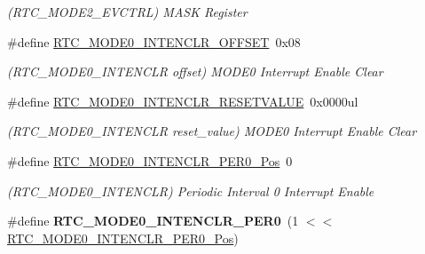 \begin{DoxyCompactItemize}
\begin{DoxyCompactList}\small\item\em (R\+T\+C\+\_\+\+M\+O\+D\+E2\+\_\+\+E\+V\+C\+T\+R\+L) M\+A\+S\+K Register \end{DoxyCompactList}\item 
\hypertarget{group___s_a_m_l21___r_t_c_ga6d79ddd70ff42554b8846fd1d2ac40f5}{}\#define \hyperlink{group___s_a_m_l21___r_t_c_ga6d79ddd70ff42554b8846fd1d2ac40f5}{R\+T\+C\+\_\+\+M\+O\+D\+E0\+\_\+\+I\+N\+T\+E\+N\+C\+L\+R\+\_\+\+O\+F\+F\+S\+E\+T}~0x08\label{group___s_a_m_l21___r_t_c_ga6d79ddd70ff42554b8846fd1d2ac40f5}

\begin{DoxyCompactList}\small\item\em (R\+T\+C\+\_\+\+M\+O\+D\+E0\+\_\+\+I\+N\+T\+E\+N\+C\+L\+R offset) M\+O\+D\+E0 Interrupt Enable Clear \end{DoxyCompactList}\item 
\hypertarget{group___s_a_m_l21___r_t_c_gae67164b37f0a35adeb3c07a552bf9f1d}{}\#define \hyperlink{group___s_a_m_l21___r_t_c_gae67164b37f0a35adeb3c07a552bf9f1d}{R\+T\+C\+\_\+\+M\+O\+D\+E0\+\_\+\+I\+N\+T\+E\+N\+C\+L\+R\+\_\+\+R\+E\+S\+E\+T\+V\+A\+L\+U\+E}~0x0000ul\label{group___s_a_m_l21___r_t_c_gae67164b37f0a35adeb3c07a552bf9f1d}

\begin{DoxyCompactList}\small\item\em (R\+T\+C\+\_\+\+M\+O\+D\+E0\+\_\+\+I\+N\+T\+E\+N\+C\+L\+R reset\+\_\+value) M\+O\+D\+E0 Interrupt Enable Clear \end{DoxyCompactList}\item 
\hypertarget{group___s_a_m_l21___r_t_c_ga805f220801b7fd0bab9ac0d3d202373d}{}\#define \hyperlink{group___s_a_m_l21___r_t_c_ga805f220801b7fd0bab9ac0d3d202373d}{R\+T\+C\+\_\+\+M\+O\+D\+E0\+\_\+\+I\+N\+T\+E\+N\+C\+L\+R\+\_\+\+P\+E\+R0\+\_\+\+Pos}~0\label{group___s_a_m_l21___r_t_c_ga805f220801b7fd0bab9ac0d3d202373d}

\begin{DoxyCompactList}\small\item\em (R\+T\+C\+\_\+\+M\+O\+D\+E0\+\_\+\+I\+N\+T\+E\+N\+C\+L\+R) Periodic Interval 0 Interrupt Enable \end{DoxyCompactList}\item 
\hypertarget{group___s_a_m_l21___r_t_c_gadaad553bd4ed98b87b27c4fa9810bf22}{}\#define {\bfseries R\+T\+C\+\_\+\+M\+O\+D\+E0\+\_\+\+I\+N\+T\+E\+N\+C\+L\+R\+\_\+\+P\+E\+R0}~(1 $<$$<$ \hyperlink{group___s_a_m_l21___r_t_c_ga805f220801b7fd0bab9ac0d3d202373d}{R\+T\+C\+\_\+\+M\+O\+D\+E0\+\_\+\+I\+N\+T\+E\+N\+C\+L\+R\+\_\+\+P\+E\+R0\+\_\+\+Pos})\label{group___s_a_m_l21___r_t_c_gadaad553bd4ed98b87b27c4fa9810bf22}


\end{DoxyCompactItemize}
